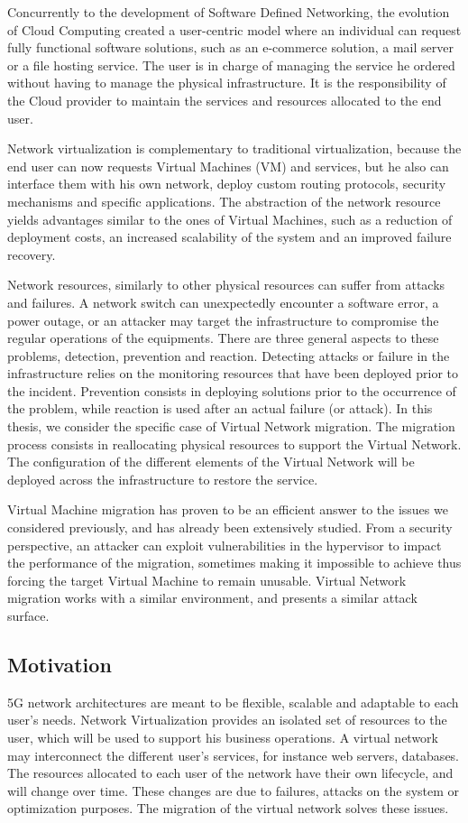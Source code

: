 Concurrently to the development of Software Defined Networking, the evolution of Cloud Computing created a user-centric model where an individual can request fully functional software solutions, such as an e-commerce solution, a mail server or a file hosting service. The user is in charge of managing the service he ordered without having to manage the physical infrastructure.
It is the responsibility of the Cloud provider to maintain the services and resources allocated to the end user.

Network virtualization is complementary to traditional virtualization, because the end user can now requests Virtual Machines (VM) and services, but he also can interface them with his own network, deploy custom routing protocols, security mechanisms and specific applications. The abstraction of the network resource yields advantages similar to the ones of Virtual Machines, such as a reduction of deployment costs, an increased scalability of the system and an improved failure recovery.

Network resources, similarly to other physical resources can suffer from attacks and failures. A network switch can unexpectedly encounter a software error, a power outage, or an attacker may target the infrastructure to compromise the regular operations of the equipments. There are three general aspects to these problems, detection, prevention and reaction. Detecting attacks or failure in the infrastructure relies on the monitoring resources that have been deployed prior to the incident. Prevention consists in deploying solutions prior to the occurrence of the problem, while reaction is used after an actual failure (or attack).
In this thesis, we consider the specific case of Virtual Network migration.
The migration process consists in reallocating physical resources to support the Virtual Network.
The configuration of the different elements of the Virtual Network will be deployed across the infrastructure to restore the service.

Virtual Machine migration has proven to be an efficient answer to the issues we considered previously, and has already been extensively studied. From a security perspective, an attacker can exploit vulnerabilities in the hypervisor to impact the performance of the migration, sometimes making it impossible to achieve thus forcing the target Virtual Machine to remain unusable.
Virtual Network migration works with a similar environment, and presents a similar attack surface.


\subsection{Motivation}
5G network architectures are meant to be flexible, scalable and adaptable to each user's needs.
Network Virtualization provides an isolated set of resources to the user, which will be used to support his business operations. A virtual network may interconnect the different user's services, for instance web servers, databases. 
The resources allocated to each user of the network have their own lifecycle, and will change over time.
These changes are due to failures, attacks on the system or optimization purposes.
The migration of the virtual network solves these issues.

